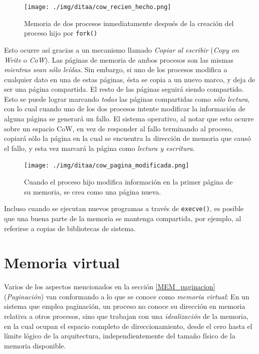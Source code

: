 \documentclass[11pt,fleqn]{book} %
\begin{document}
\begin{figure}[htb]
\centering
\texttt{[image: ./img/ditaa/cow\_recien\_hecho.png]}
\caption{\label{MEM_cow_recien_hecho}Memoria de dos procesos inmediatamente después de la creación del proceso hijo por \texttt{fork()}}
\end{figure}

Esto ocurre así gracias a un mecanismo llamado \emph{Copiar al escribir}
(\emph{Copy on Write} o \emph{CoW}). Las páginas de memoria de ambos procesos
son las mismas \emph{mientras sean sólo leídas}. Sin embargo, si uno de los
procesos modifica a cualquier dato en una de estas páginas, ésta se
copia a un nuevo marco, y deja de ser una página compartida. El resto
de las páginas seguirá siendo compartido. Esto se puede lograr
marcando \emph{todas} las páginas compartidas como \emph{sólo lectura}, con lo
cual cuando uno de los dos procesos intente modificar la información
de alguna página se generará un fallo. El sistema operativo, al notar
que esto ocurre sobre un espacio CoW, en vez de responder al fallo
terminando al proceso, copiará sólo la página en la cual se encuentra
la dirección de memoria que causó el fallo, y esta vez marcará la
página como \emph{lectura y escritura}.

\begin{figure}[htb]
\centering
\texttt{[image: ./img/ditaa/cow\_pagina\_modificada.png]}
\caption{\label{MEM_cow_pagina_modificada}Cuando el proceso hijo modifica información en la primer página de su memoria, se crea como una página nueva.}
\end{figure}

Incluso cuando se ejecutan nuevos programas a través de \texttt{execve()},
es posible que una buena parte de la memoria se mantenga compartida,
por ejemplo, al referirse a copias de bibliotecas de sistema.
\section{Memoria virtual}
\label{sec-5-5}


Varios de los aspectos mencionados en la sección \ref{MEM_paginacion}
(\emph{Paginación}) van conformando a lo que se conoce como \emph{memoria virtual}: En un sistema que emplea paginación, un proceso
no conoce su dirección en memoria relativa a otros procesos, sino que
trabajan con una \emph{idealización} de la memoria, en la cual ocupan el
espacio completo de direccionamiento, desde el cero hasta el límite
lógico de la arquitectura, independientemente del tamaño físico de la
memoria disponible.
\end{document}
